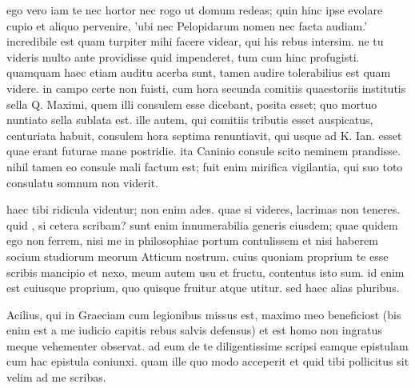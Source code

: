 


 ego vero iam te nec hortor nec rogo ut domum redeas; quin hinc ipse evolare cupio et aliquo pervenire, 'ubi nec Pelopidarum nomen nec facta audiam.' incredibile est quam turpiter mihi facere videar, qui his rebus intersim. ne tu videris multo ante providisse quid impenderet, tum cum hinc profugisti. quamquam haec etiam auditu acerba sunt, tamen audire tolerabilius est quam videre. in campo certe non fuisti, cum hora secunda comitiis quaestoriis institutis sella Q. Maximi, quem illi consulem esse dicebant, posita esset; quo mortuo nuntiato sella sublata est. ille autem, qui comitiis tributis esset auspicatus, centuriata habuit, consulem hora septima renuntiavit, qui usque ad K. Ian. esset quae erant futurae mane postridie. ita Caninio consule scito neminem prandisse. nihil tamen eo consule mali factum est; fuit enim mirifica vigilantia, qui suo toto consulatu somnum non viderit.

 haec tibi ridicula videntur; non enim ades. quae si videres, lacrimas non teneres. quid , si cetera scribam? sunt enim innumerabilia generis eiusdem; quae quidem ego non ferrem, nisi me in philosophiae portum contulissem et nisi haberem socium studiorum meorum Atticum nostrum. cuius quoniam proprium te esse scribis mancipio et nexo, meum autem usu et fructu, contentus isto sum. id enim est cuiusque proprium, quo quisque fruitur atque utitur. sed haec alias pluribus.

 Acilius, qui in Graeciam cum legionibus missus est, maximo meo beneficiost (bis enim est a me iudicio capitis rebus salvis defensus) et est homo non ingratus meque vehementer observat. ad eum de te diligentissime scripsi eamque epistulam cum hac epistula coniunxi. quam ille quo modo acceperit et quid tibi pollicitus sit velim ad me scribas.
